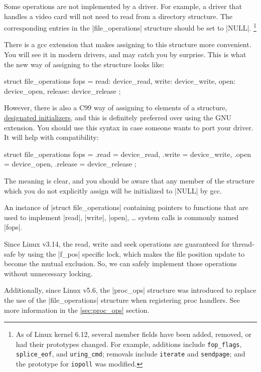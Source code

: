 \documentclass[10pt, oneside]{book}
\begin{document}
Some operations are not implemented by a driver.
For example, a driver that handles a video card will not need to read from a directory structure.
The corresponding entries in the \cpp|file_operations| structure should be set to \cpp|NULL|.
\footnote{
As of Linux kernel 6.12, several member fields have been added, removed, or had their prototypes changed.
For example, additions include \texttt{fop\_flags}, \texttt{splice\_eof}, and \texttt{uring\_cmd};
removals include \texttt{iterate} and \texttt{sendpage}; and the prototype for \texttt{iopoll} was modified.
}

There is a gcc extension that makes assigning to this structure more convenient.
You will see it in modern drivers, and may catch you by surprise.
This is what the new way of assigning to the structure looks like:

\begin{code}
struct file_operations fops = {
	read: device_read,
	write: device_write,
	open: device_open,
	release: device_release
};
\end{code}

However, there is also a C99 way of assigning to elements of a structure, \href{https://gcc.gnu.org/onlinedocs/gcc/Designated-Inits.html}{designated initializers}, and this is definitely preferred over using the GNU extension.
You should use this syntax in case someone wants to port your driver.
It will help with compatibility:

\begin{code}
struct file_operations fops = {
	.read = device_read,
	.write = device_write,
	.open = device_open,
	.release = device_release
};
\end{code}

The meaning is clear, and you should be aware that any member of the structure which you do not explicitly assign will be initialized to \cpp|NULL| by gcc.

An instance of \cpp|struct file_operations| containing pointers to functions that are used to implement \cpp|read|, \cpp|write|, \cpp|open|, \ldots{} system calls is commonly named \cpp|fops|.

Since Linux v3.14, the read, write and seek operations are guaranteed for thread-safe by using the \cpp|f_pos| specific lock, which makes the file position update to become the mutual exclusion.
So, we can safely implement those operations without unnecessary locking.

Additionally, since Linux v5.6, the \cpp|proc_ops| structure was introduced to replace the use of the \cpp|file_operations| structure when registering proc handlers.
See more information in the \ref{sec:proc_ops} section.
\end{document}
